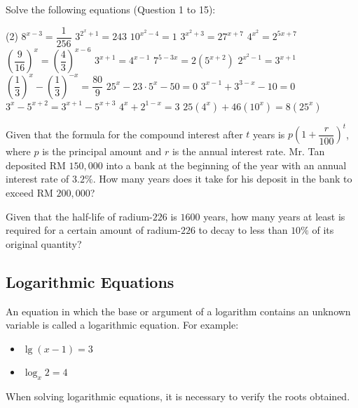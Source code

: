 \documentclass{report}
\begin{document}
			
			Solve the following equations (Question 1 to 15):
			\begin{tasks}[label=\arabic*.](2)
				\task $8^{x-3}=\dfrac{1}{256}$
				\task $3^{2^x+1}=243$
				\task $10^{x^2-4}=1$
				\task $3^{x^2+3}=27^{x+7}$
				\task $4^{x^2}=2^{5 x+7}$
				\task $\left(\dfrac{9}{16}\right)^x=\left(\dfrac{4}{3}\right)^{x-6}$
				\task $3^{x+1}=4^{x-1}$
				\task $7^{5-3 x}=2\left(5^{x+2}\right)$
				\task $2^{x^2-1}=3^{x+1}$
				\task  $\left(\dfrac{1}{3}\right)^x-\left(\dfrac{1}{3}\right)^{-x}=\dfrac{80}{9}$
				\task $25^x-23 \cdot 5^x-50=0$
				\task $3^{x-1}+3^{3-x}-10=0$
				\task $3^x-5^{x+2}=3^{x+1}-5^{x+3}$
				\task $4^x+2^{1-x}=3$
				\task $25\left(4^x\right)+46\left(10^x\right)=8\left(25^x\right)$
			\end{tasks}
			\begin{tasks}[label=\arabic*, resume]
				\task Given that the formula for the compound interest after \( t \) years is \( p\left(1+\dfrac{r}{100}\right)^t \), where \( p \) is the principal amount and \( r \) is the annual interest rate. Mr. Tan deposited RM $150,000$ into a bank at the beginning of the year with an annual interest rate of \( 3.2\% \). How many years does it take for his deposit in the bank to exceed RM $200,000$?
				
				\task Given that the half-life of radium-$226$ is $1600$ years, how many years at least is required for a certain amount of radium-$226$ to decay to less than \( 10\% \) of its original quantity?
			\end{tasks}
			
			\subsection*{Logarithmic Equations}
			
			An equation in which the base or argument of a logarithm contains an unknown variable is called a logarithmic equation. For example:
			\vspace{-1em}
			\begin{itemize}
				\item $\lg (x-1)=3$
				\item $\log _x 2=4$
			\end{itemize}
			        
			\vspace{-1em}
			When solving logarithmic equations, it is necessary to verify the roots obtained.
			
\end{document}
